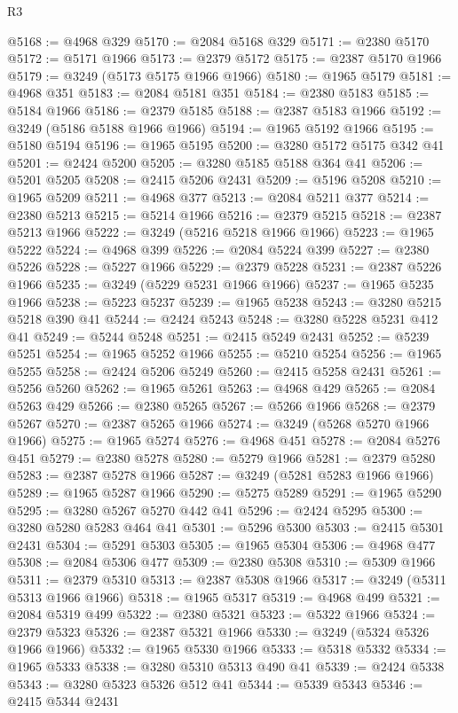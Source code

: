 \begin{lexlean}{R3}
\begin{coremodule}
@5168 := @4968 @329
@5170 := @2084 @5168 @329
@5171 := @2380 @5170
@5172 := @5171 @1966
@5173 := @2379 @5172
@5175 := @2387 @5170 @1966
@5179 := @3249 (@5173 @5175 @1966 @1966)
@5180 := @1965 @5179
@5181 := @4968 @351
@5183 := @2084 @5181 @351
@5184 := @2380 @5183
@5185 := @5184 @1966
@5186 := @2379 @5185
@5188 := @2387 @5183 @1966
@5192 := @3249 (@5186 @5188 @1966 @1966)
@5194 := @1965 @5192 @1966
@5195 := @5180 @5194
@5196 := @1965 @5195
@5200 := @3280 @5172 @5175 @342 @41
@5201 := @2424 @5200
@5205 := @3280 @5185 @5188 @364 @41
@5206 := @5201 @5205
@5208 := @2415 @5206 @2431
@5209 := @5196 @5208
@5210 := @1965 @5209
@5211 := @4968 @377
@5213 := @2084 @5211 @377
@5214 := @2380 @5213
@5215 := @5214 @1966
@5216 := @2379 @5215
@5218 := @2387 @5213 @1966
@5222 := @3249 (@5216 @5218 @1966 @1966)
@5223 := @1965 @5222
@5224 := @4968 @399
@5226 := @2084 @5224 @399
@5227 := @2380 @5226
@5228 := @5227 @1966
@5229 := @2379 @5228
@5231 := @2387 @5226 @1966
@5235 := @3249 (@5229 @5231 @1966 @1966)
@5237 := @1965 @5235 @1966
@5238 := @5223 @5237
@5239 := @1965 @5238
@5243 := @3280 @5215 @5218 @390 @41
@5244 := @2424 @5243
@5248 := @3280 @5228 @5231 @412 @41
@5249 := @5244 @5248
@5251 := @2415 @5249 @2431
@5252 := @5239 @5251
@5254 := @1965 @5252 @1966
@5255 := @5210 @5254
@5256 := @1965 @5255
@5258 := @2424 @5206 @5249
@5260 := @2415 @5258 @2431
@5261 := @5256 @5260
@5262 := @1965 @5261
@5263 := @4968 @429
@5265 := @2084 @5263 @429
@5266 := @2380 @5265
@5267 := @5266 @1966
@5268 := @2379 @5267
@5270 := @2387 @5265 @1966
@5274 := @3249 (@5268 @5270 @1966 @1966)
@5275 := @1965 @5274
@5276 := @4968 @451
@5278 := @2084 @5276 @451
@5279 := @2380 @5278
@5280 := @5279 @1966
@5281 := @2379 @5280
@5283 := @2387 @5278 @1966
@5287 := @3249 (@5281 @5283 @1966 @1966)
@5289 := @1965 @5287 @1966
@5290 := @5275 @5289
@5291 := @1965 @5290
@5295 := @3280 @5267 @5270 @442 @41
@5296 := @2424 @5295
@5300 := @3280 @5280 @5283 @464 @41
@5301 := @5296 @5300
@5303 := @2415 @5301 @2431
@5304 := @5291 @5303
@5305 := @1965 @5304
@5306 := @4968 @477
@5308 := @2084 @5306 @477
@5309 := @2380 @5308
@5310 := @5309 @1966
@5311 := @2379 @5310
@5313 := @2387 @5308 @1966
@5317 := @3249 (@5311 @5313 @1966 @1966)
@5318 := @1965 @5317
@5319 := @4968 @499
@5321 := @2084 @5319 @499
@5322 := @2380 @5321
@5323 := @5322 @1966
@5324 := @2379 @5323
@5326 := @2387 @5321 @1966
@5330 := @3249 (@5324 @5326 @1966 @1966)
@5332 := @1965 @5330 @1966
@5333 := @5318 @5332
@5334 := @1965 @5333
@5338 := @3280 @5310 @5313 @490 @41
@5339 := @2424 @5338
@5343 := @3280 @5323 @5326 @512 @41
@5344 := @5339 @5343
@5346 := @2415 @5344 @2431

\end{coremodule}
\end{lexlean}
